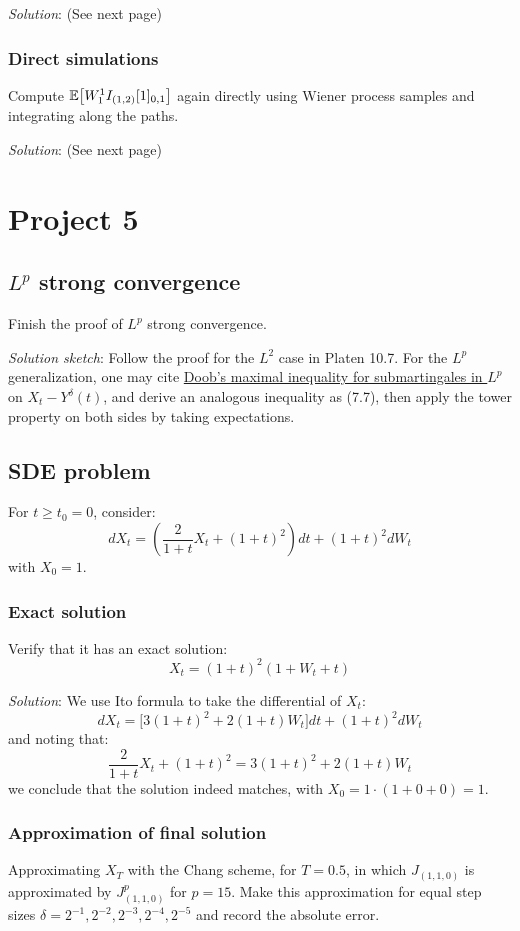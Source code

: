 \documentclass{article}
\begin{document}
\emph{Solution}: (See next page)
\subsubsection{Direct simulations} Compute $\mathbb{E}\big[ {W_1^1I_{(1,2)}[1]_{0,1}} \big]$ again directly using Wiener process samples and integrating along the paths.

\emph{Solution}: (See next page)




\section{Project 5}
\subsection{$L^p$ strong convergence} Finish the proof of $L^p$ strong convergence.

\emph{Solution sketch}: Follow the proof for the $L^2$ case in Platen 10.7. For the $L^p$ generalization, one may cite \href{https://en.wikipedia.org/wiki/Doob\%27s_martingale_inequality}{Doob's maximal inequality for submartingales in $L^p$} on $X_t - Y^{\delta}(t)$, and derive an analogous inequality as (7.7), then apply the tower property on both sides by taking expectations.

\subsection{SDE problem} For $t\ge t_0=0$, consider:
$$
    dX_t = (\frac{2}{1+t}X_t + (1+t)^2)dt + (1+t)^2dW_t
$$ with $X_0=1$.

\subsubsection{Exact solution} Verify that it has an exact solution:
$$
    X_t = (1+t)^2(1+W_t+t)
$$

\emph{Solution}: We use Ito formula to take the differential of $X_t$:
$$
    dX_t = \big[3(1+t)^2+2(1+t)W_t\big]dt + (1+t)^2dW_t
$$ and noting that:
$$
    \frac{2}{1+t}X_t + (1+t)^2 = 3(1+t)^2 + 2(1+t)W_t
$$ we conclude that the solution indeed matches, with $X_0 = 1\cdot (1+0+0) = 1$. 
\subsubsection{Approximation of final solution} Approximating $X_T$ with the Chang scheme, for $T=0.5$, in which $J_{(1,1,0)}$ is approximated by $J_{(1,1,0)}^p$ for $p=15$. Make this approximation for equal step sizes $\delta = 2^{-1}, 2^{-2}, 2^{-3}, 2^{-4}, 2^{-5}$ and record the absolute error. 
\end{document}
